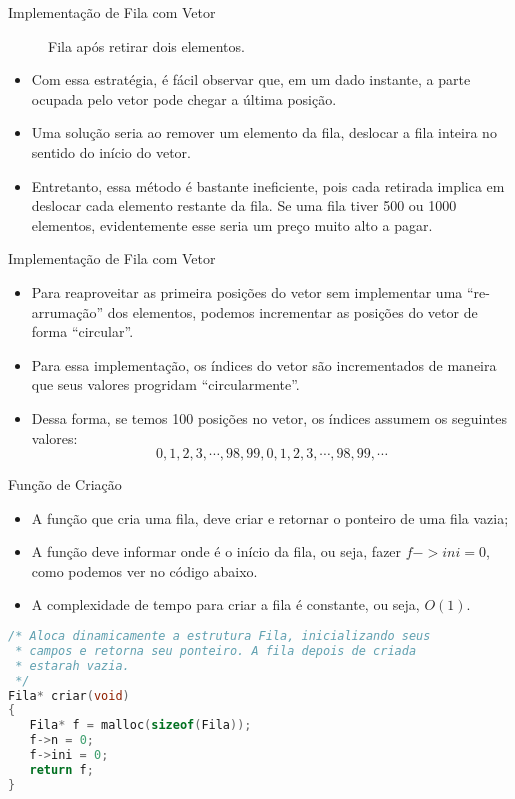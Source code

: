 \begin{frame}{Implementação de Fila com Vetor}	
	\begin{figure}[ht]
				\centering
				\caption{Fila após retirar dois elementos.}	
	\end{figure} 	
	\begin{itemize}
		\item Com essa estratégia, é fácil observar que, em um dado instante, a parte ocupada pelo vetor pode chegar a última posição.
		\item Uma solução seria ao remover um elemento da fila, deslocar a fila inteira no sentido do início do vetor.
		\item Entretanto, essa método é bastante ineficiente, pois cada retirada implica em deslocar cada elemento restante da fila. Se uma fila tiver 500 ou 1000 elementos, evidentemente esse seria um preço muito alto a pagar.		
	\end{itemize}
\end{frame}

\begin{frame}{Implementação de Fila com Vetor}		
	\begin{itemize}		
		\item Para reaproveitar as primeira posições do vetor sem implementar uma ``re-arrumação'' dos elementos, podemos incrementar as posições do vetor de forma ``circular''.
		\item Para essa implementação, os índices do vetor são incrementados de maneira que seus valores progridam ``circularmente''. 
		\item Dessa forma, se temos 100 posições no vetor, os índices assumem os seguintes valores:
		$$0, 1, 2, 3, \cdots, 98, 99, 0, 1, 2, 3, \cdots, 98, 99, \cdots$$
	\end{itemize}
\end{frame}

\begin{frame}[fragile]{Função de Criação}
	\begin{itemize}
		\item A função que cria uma fila, deve criar e retornar o ponteiro de uma fila vazia;
		\item A função deve informar onde é o início da fila, ou seja, fazer $f->ini = 0$, como podemos ver no código abaixo.
		\item A complexidade de tempo para criar a fila é constante, ou seja, $O(1)$.
	\end{itemize}
\small	
\begin{lstlisting}[language=C]
/* Aloca dinamicamente a estrutura Fila, inicializando seus
 * campos e retorna seu ponteiro. A fila depois de criada
 * estarah vazia.
 */
Fila* criar(void)
{
   Fila* f = malloc(sizeof(Fila));
   f->n = 0;
   f->ini = 0;
   return f;
}\end{lstlisting}
\end{frame}

